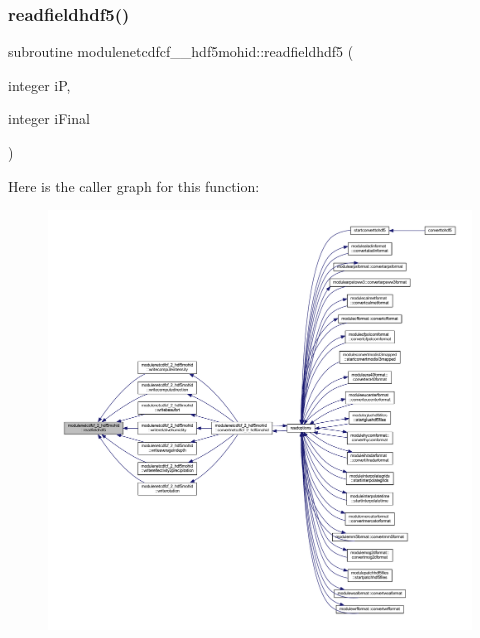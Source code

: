 \subsubsection{\texorpdfstring{readfieldhdf5()}{readfieldhdf5()}}
{\footnotesize\ttfamily subroutine modulenetcdfcf\+\_\+\_\+hdf5mohid\+::readfieldhdf5 (\begin{DoxyParamCaption}\item[{integer}]{iP,  }\item[{integer}]{i\+Final }\end{DoxyParamCaption})\hspace{0.3cm}{\ttfamily [private]}}

Here is the caller graph for this function\+:\nopagebreak
\begin{figure}[H]
\begin{center}
\leavevmode
\includegraphics[width=350pt]{namespacemodulenetcdfcf__2__hdf5mohid_af3d93c43025a8ea4bfc12e430d456ac3_icgraph}
\end{center}
\end{figure}
\mbox{\label{namespacemodulenetcdfcf__2__hdf5mohid_ac66f8e687cb8a5fe1cb48f9f02300915}} 
